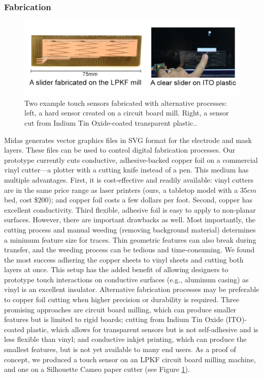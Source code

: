    \subsubsection{Fabrication}
    
    \begin{figure}[b]
    \centering
\includegraphics[width=\textwidth]{figures/midas/otheroptions.png}
\caption{Two example touch sensors fabricated with alternative processes: left, a hard sensor created on a circuit board mill. Right, a sensor cut from Indium Tin Oxide-coated transparent plastic..} 
\label{fig:midas-dimatix}
\end{figure}

Midas generates vector graphics files in SVG format for the
electrode and mask layers. These files can be used to control
digital fabrication processes. Our prototype currently
cuts conductive, adhesive-backed copper foil on a commercial
vinyl cutter---a plotter with a cutting knife instead of a
pen. This medium has multiple advantages. First, it is cost-effective
and readily available: vinyl cutters are in the same
price range as laser printers (ours, a tabletop model with a
$35cm$ bed, cost \$$200$); and copper foil costs a few dollars
per foot. Second, copper has excellent conductivity. Third
flexible, adhesive foil is easy to apply to non-planar surfaces.
However, there are important drawbacks as well. Most importantly,
the cutting process and manual weeding (removing
background material) determines a minimum feature size
for traces. Thin geometric features can also break during
transfer, and the weeding process can be tedious and time-consuming.
We found the most success adhering
the copper sheets to vinyl sheets and cutting both layers at
once. This setup has the added benefit of allowing designers
to prototype touch interactions on conductive surfaces (e.g.,
aluminum casing) as vinyl is an excellent insulator.
Alternative fabrication processes may be preferable to copper
foil cutting when higher precision or durability is required.
Three promising approaches are circuit board milling, which
can produce smaller features but is limited to rigid boards; cutting from Indium Tin Oxide (ITO)-coated plastic, which allows for transparent sensors but is not self-adhesive and is less flexible than vinyl;
and conductive inkjet printing, which can produce the smallest
features, but is not yet available to many end users. As
a proof of concept, we produced a touch sensor on an LPKF
circuit board milling machine, and one on a Silhouette Cameo paper cutter (see Figure \ref{fig:midas-dimatix}).

